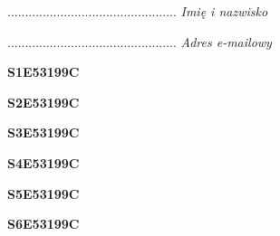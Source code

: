 \begin{turn}{90}\begin{minipage}{\linewidth} \vspace{20mm} ................................................  \textit{Imię i nazwisko}\end{minipage}\end{turn}

\begin{turn}{90}\begin{minipage}{\linewidth} \vspace{20mm} ................................................  \textit{Adres e-mailowy}\end{minipage}\end{turn}

\begin{turn}{90}\huge \begin{minipage}{\linewidth} \vspace{10mm}\textbf{S1E53199C}\end{minipage}\end{turn}

\begin{turn}{90}\huge \begin{minipage}{\linewidth} \vspace{10mm}\textbf{S2E53199C}\end{minipage}\end{turn}

\begin{turn}{90}\huge \begin{minipage}{\linewidth} \vspace{10mm}\textbf{S3E53199C}\end{minipage}\end{turn}

\begin{turn}{90}\huge \begin{minipage}{\linewidth} \vspace{10mm}\textbf{S4E53199C}\end{minipage}\end{turn}

\begin{turn}{90}\huge \begin{minipage}{\linewidth} \vspace{10mm}\textbf{S5E53199C}\end{minipage}\end{turn}

\begin{turn}{90}\huge \begin{minipage}{\linewidth} \vspace{10mm}\textbf{S6E53199C}\end{minipage}\end{turn}


